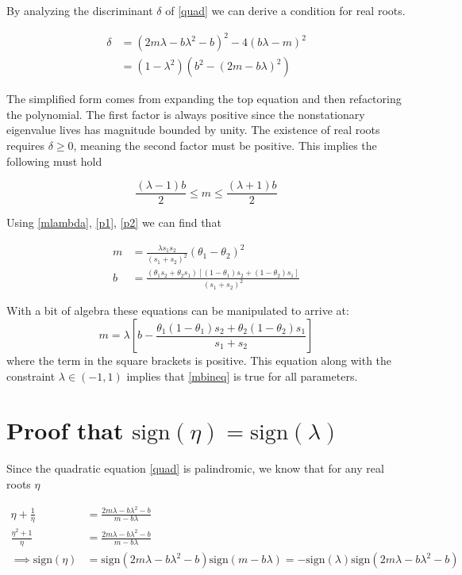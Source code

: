 \documentclass{article}
\begin{document}
By analyzing the discriminant $\delta$ of \eqref{quad} we can derive a condition for real roots. 

\begin{align}
    \delta &= (2m\lambda - b\lambda^2 -b)^2 - 4(b\lambda-m)^2\\
    &= (1-\lambda^2)(b^2 - (2m-b\lambda)^2)
\end{align}

The simplified form comes from expanding the top equation and then refactoring the polynomial. The first factor is always positive since the nonstationary eigenvalue lives has magnitude bounded by unity. The existence of real roots requires $\delta \ge 0$, meaning the second factor must be positive. This implies the following must hold

\begin{equation}\label{mbineq}
    \frac{(\lambda -1)b}{2} \le m \le \frac{(\lambda+1)b}{2}
\end{equation}

Using \eqref{mlambda}, \eqref{p1}, \eqref{p2} we can find that 

\begin{align}
    m &= \frac{\lambda s_1s_2}{(s_1+s_2)^2}(\theta_1 -\theta_2)^2 \\
    b &= \frac{(\theta_1s_2 + \theta_2s_1)[(1-\theta_1)s_2 + (1-\theta_2)s_1]}{(s_1 + s_2)^2}
\end{align}

With a bit of algebra these equations can be manipulated to arrive at:
\begin{equation}\label{mbid}
    m = \lambda\left[b - \frac{\theta_1(1-\theta_1)s_2 + \theta_2(1-\theta_2)s_1}{s_1+s_2}\right]
\end{equation}
where the term in the square brackets is positive. This equation along with the constraint $\lambda \in (-1,1)$ implies that \eqref{mbineq} is true for all parameters. 

\section{Proof that $\text{sign}(\eta) = \text{sign}(\lambda)$}\label{sec:signed}

Since the quadratic equation \eqref{quad} is palindromic, we know that for any real roots $\eta$

\begin{align}
    \eta + \frac{1}{\eta} &= \frac{2m\lambda - b\lambda^2-b}{m-b\lambda} \\
    \frac{\eta^2 + 1}{\eta} &= \frac{2m\lambda - b\lambda^2-b}{m-b\lambda} \\
    \implies \text{sign}(\eta) &= \text{sign}(2m\lambda - b\lambda^2-b)\text{sign}(m-b\lambda) = -\text{sign}(\lambda)\text{sign}(2m\lambda - b\lambda^2-b)
\end{align}
\end{document}
